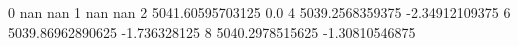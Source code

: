 0 nan nan
1 nan nan
2 5041.60595703125 0.0
4 5039.2568359375 -2.34912109375
6 5039.86962890625 -1.736328125
8 5040.2978515625 -1.30810546875
